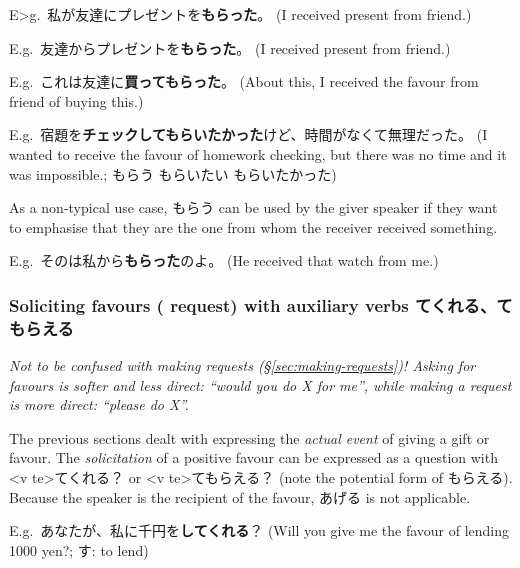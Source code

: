 \documentclass[../nihongo-gakushuu-kyouzai.tex]{subfiles}
\begin{document}


E>g.\ 私が友達にプレゼントを\textbf{もらった}。 (I received present from friend.)

E.g.\ 友達からプレゼントを\textbf{もらった}。 (I received present from friend.)

E.g.\ これは友達に\textbf{買ってもらった}。 (About this, I received the favour from friend of buying this.)

E.g.\ 宿題を\textbf{チェックしてもらいたかった}けど、時間がなくて無理だった。 (I wanted to receive the favour of homework checking, but there was no time and it was impossible.; もらう \to{} もらいたい \to{} もらいたかった)

As a non-typical use case, もらう can be used by the giver speaker if they want to emphasise that they are the one from whom the receiver received something.

E.g.\ そのは私から\textbf{もらった}のよ。 (He received that watch from me.)

\subsubsection{Soliciting favours (\neq{} request) with auxiliary verbs てくれる、てもらえる} \label{sec:soliciting-favours-kureru-moraeru}
\emph{Not to be confused with making requests (\S\ref{sec:making-requests})! Asking for favours is softer and less direct: ``would you do X for me'', while making a request is more direct: ``please do X''.}

The previous sections dealt with expressing the \emph{actual event} of giving a gift or favour. The \emph{solicitation} of a positive favour can be expressed as a question with <v te>てくれる？ or <v te>てもらえる？ (note the potential form of もらえる). Because the speaker is the recipient of the favour, あげる is not applicable.


E.g.\ あなたが、私に千円を\textbf{してくれる}？ (Will you give me the favour of lending 1000 yen?; す: to lend)
\end{document}
